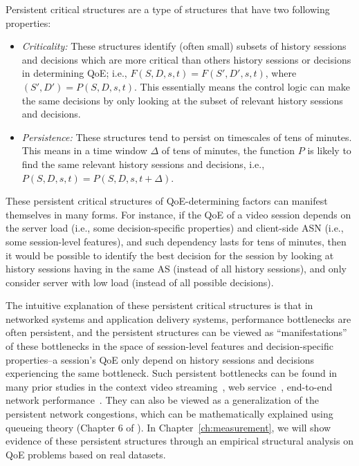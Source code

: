 Persistent critical structures are a type of structures that have two following 
properties:

\begin{itemize}

\item {\em Criticality:} These structures identify (often small) subsets of history
sessions and decisions which are more critical than others history sessions 
or decisions in determining QoE; i.e.,
$F(S,D,s,t)=F(S',D',s,t)$, where $(S',D')=P(S,D,s,t)$. This essentially
means the \ddn control logic can make the same decisions by
only looking at the subset of relevant history sessions and decisions.

\item {\em Persistence:} These structures tend to persist on timescales of 
tens of minutes. This means in a time window $\Delta$ 
of  tens of minutes, the function $P$ is likely 
to find the same relevant history sessions and decisions,
i.e., $P(S,D,s,t)=P(S,D,s,t+\Delta)$.

\end{itemize}


These persistent critical structures of QoE-determining factors can 
manifest themselves in many forms.
For instance, if the QoE of a video session depends on
the server load (i.e., some decision-specific properties)
and client-side ASN (i.e., some session-level features), and such
dependency lasts for tens of minutes,
then it would be possible to identify the best decision for
the session by looking
at history sessions having in the same AS 
(instead of all history sessions), and only consider server with 
low load (instead of all possible decisions).

The intuitive explanation of these persistent critical structures 
is that in networked systems and application delivery  systems, performance
bottlenecks are often persistent, and the persistent structures
can be viewed as ``manifestations'' of these bottlenecks in the space of 
session-level features and decision-specific properties--a session's QoE
only depend on history sessions and decisions 
experiencing the same bottleneck.
Such persistent bottlenecks can be found in many prior studies in the context
video streaming~\cite{cfa}, 
web service~\cite{footprint}, end-to-end
network performance~\cite{zhang2001constancy}.
They can also be viewed as a generalization of the persistent 
network congestions, which can be mathematically explained using queueing theory
(Chapter 6 of \cite{keshav2012mathematical}).
In Chapter~\ref{ch:measurement}, we will show evidence of these persistent
structures through an empirical structural analysis on  QoE
problems based on real datasets.

